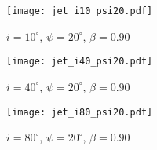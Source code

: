 \documentclass[iop]{emulateapj}
\begin{document}



\pagebreak
\pagebreak

\clearpage

\begin{figure}
  \begin{center}
    \texttt{[image: jet\_i10\_psi20.pdf]}
  \end{center}
  \caption{$i=10^\circ$, $\psi=20^\circ$, $\beta=0.90$}
\end{figure}

\begin{figure}
  \begin{center}
    \texttt{[image: jet\_i40\_psi20.pdf]}
  \end{center}
  \caption{$i=40^\circ$, $\psi=20^\circ$, $\beta=0.90$}
\end{figure}

\begin{figure}
  \begin{center}
    \texttt{[image: jet\_i80\_psi20.pdf]}
  \end{center}
  \caption{$i=80^\circ$, $\psi=20^\circ$, $\beta=0.90$}
\end{figure}
\end{document}
